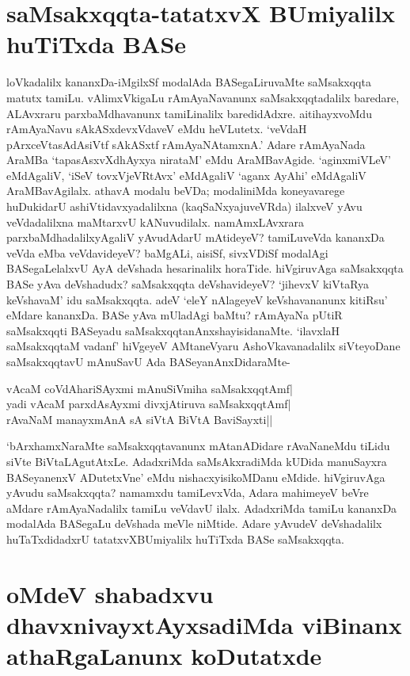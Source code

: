\section*{saMsakxqqta-tatatxvX BUmiyalilx huTiTxda BASe}

loVkadalilx kananxDa-iMgilxSf modalAda BASegaLiruvaMte saMsakxqqta matutx tamiLu. vAlimxVkigaLu rAmAyaNavanunx saMsakxqqtadalilx baredare, ALAvxraru parxbaMdhavanunx tamiLinalilx baredidAdxre. aitihayxvoMdu rAmAyaNavu sAkASxdevxVdaveV eMdu heVLutetx. `veVdaH pArxceVtasAdAsiVtf\label{232c} sAkASxtf rAmAyaNAtamxnA.' Adare rAmAyaNada AraMBa `tapasAsxvXdhAyxya nirataM'\label{232e} eMdu AraMBavAgide. `aginxmiVLeV' eMdAgaliV, `iSeV tovxVjeVRtAvx' eMdAgaliV `aganx AyAhi' eMdAgaliV AraMBavAgilalx. athavA modalu beVDa; modaliniMda koneyavarege huDukidarU ashiVtidavxyadalilxna (kaqSaNxyajuveVRda) ilalxveV yAvu veVdadalilxna maMtarxvU kANuvudilalx. namAmxLAvxrara parxbaMdhadalilxyAgaliV yAvudAdarU mAtideyeV? tamiLuveVda kananxDa veVda eMba veVdavideyeV? baMgALi, aisiSf, sivxVDiSf modalAgi BASegaLelalxvU AyA‌ deVshada hesarinalilx horaTide. hiVgiruvAga saMsakxqqta BASe yAva deVshadudx? saMsakxqqta deVshavideyeV? `jihevxV kiVtaRya keVshavaM'\label{232d} idu saMsakxqqta. adeV `eleY nAlageyeV keVshavananunx kitiRsu' eMdare kananxDa. BASe yAva mUladAgi baMtu? rAmAyaNa pUtiR saMsakxqqti BASeyadu saMsakxqqtanAnxshayisidanaMte. `ilavxlaH saMsakxqqtaM vadanf'\label{232a} hiVgeyeV AMtaneVyaru AshoVkavanadalilx siVteyoDane  saMsakxqqtavU mAnuSavU Ada BASeyanAnxDidaraMte-

\begin{shloka}
vAcaM coVdAhariSAyxmi mAnuSiVmiha saMsakxqqtAmf|\label{232b}\\
yadi vAcaM parxdAsAyxmi divxjAtiruva saMsakxqqtAmf|\\
rAvaNaM manayxmAnA‌ sA siVtA BiVtA BaviSayxti||
\end{shloka}

`bArxhamxNaraMte saMsakxqqtavanunx mAtanADidare rAvaNaneMdu tiLidu siVte BiVtaLAgutAtxLe. AdadxriMda saMsAkxradiMda kUDida manuSayxra BASeyanenxV ADutetxVne' eMdu nishacxyisikoMDanu eMdide. hiVgiruvAga yAvudu saMsakxqqta? namamxdu tamiLevxVda, Adara mahimeyeV beVre aMdare rAmAyaNadalilx tamiLu veVdavU ilalx. AdadxriMda tamiLu kananxDa modalAda BASegaLu deVshada meVle niMtide. Adare yAvudeV deVshadalilx huTaTxdidadxrU tatatxvXBUmiyalilx huTiTxda BASe saMsakxqqta. 

\section*{oMdeV shabadxvu dhavxnivayxtAyxsadiMda viBinanx athaRgaLanunx koDutatxde}

